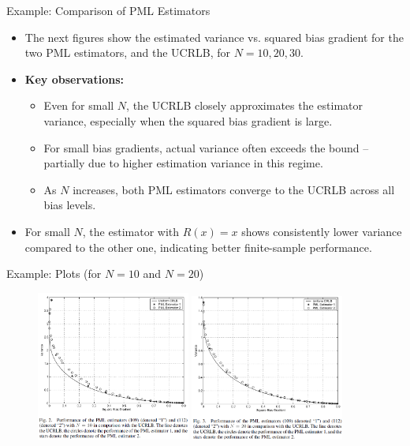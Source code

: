 \documentclass{beamer}
\begin{document}
\begin{frame}{Example: Comparison of PML Estimators}

\begin{itemize}
    \item The next figures show the estimated variance vs. squared bias gradient for the two PML estimators, and the UCRLB, for \( N = 10, 20, 30 \).
    
    \item \textbf{Key observations:}
    \begin{itemize}
        \item Even for small \( N \), the UCRLB closely approximates the estimator variance, especially when the squared bias gradient is large.
        \item For small bias gradients, actual variance often exceeds the bound -- partially due to higher estimation variance in this regime.
        \item As \( N \) increases, both PML estimators converge to the UCRLB across all bias levels.
    \end{itemize}
    
    \item For small \( N \), the estimator with $R(x) = x$ shows consistently lower variance compared to the other one, indicating better finite-sample performance.
\end{itemize}

\end{frame}

\begin{frame}{Example: Plots (for $N = 10$ and $N = 20$)}
\begin{figure}
    \centering
    \includegraphics[width=0.45\textwidth]{figures/fig2.png}
    \includegraphics[width=0.45\textwidth]{figures/fig3.png}
\end{figure}
\end{frame}
\end{document}

